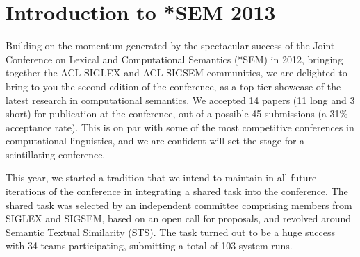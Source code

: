 \section*{Introduction to *SEM 2013}\vspace{2em}

Building on the momentum generated by the spectacular success of the
Joint Conference on Lexical and Computational Semantics (*SEM) in 2012,
bringing together the ACL SIGLEX and ACL SIGSEM communities, we are
delighted to bring to you the second edition of the conference, as a
top-tier showcase of the latest research in computational semantics. We
accepted 14 papers (11 long and 3 short) for publication at the
conference, out of a possible 45 submissions (a 31\% acceptance
rate). This is on par with some of the most competitive conferences in
computational linguistics, and we are confident will set the stage for a
scintillating conference.  

This year, we started a tradition that we intend to maintain in all
future iterations of the conference in integrating a shared task into
the conference. The shared task was selected by an independent committee
comprising members from SIGLEX and SIGSEM, based on an open call for
proposals, and revolved around Semantic Textual Similarity (STS). The
task turned out to be a huge success with 34 teams participating,
submitting a total of 103 system runs.

